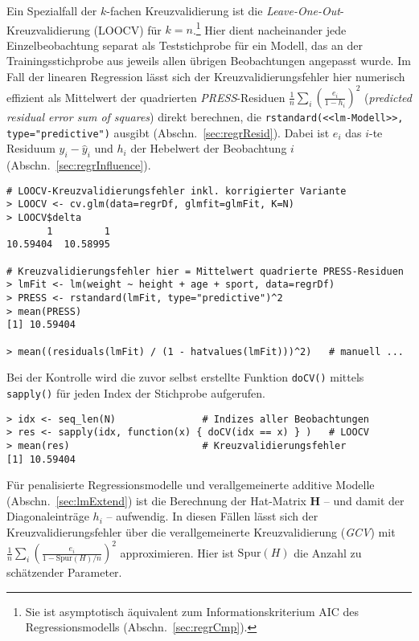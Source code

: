 Ein Spezialfall der $k$-fachen Kreuzvalidierung ist die \emph{Leave-One-Out}-Kreuzvalidierung (LOOCV) für $k = n$.\footnote{Sie ist asymptotisch äquivalent zum Informationskriterium AIC des Regressionsmodells (Abschn.\ \ref{sec:regrCmp}).} Hier dient nacheinander jede Einzelbeobachtung separat als Teststichprobe für ein Modell, das an der Trainingsstichprobe aus jeweils allen übrigen Beobachtungen angepasst wurde. Im Fall der linearen Regression lässt sich der Kreuzvalidierungsfehler hier numerisch effizient als Mittelwert der quadrierten \emph{PRESS}-Residuen $\frac{1}{n} \sum_{i}{\left(\frac{e_{i}}{1 - h_{i}}\right)^{2}}$ (\emph{predicted residual error sum of squares}) direkt berechnen, die \lstinline!rstandard(<<lm-Modell>>, type="predictive")! ausgibt (Abschn.\ \ref{sec:regrResid}). Dabei ist $e_{i}$ das $i$-te Residuum $y_{i} - \hat{y}_{i}$ und $h_{i}$ der Hebelwert der Beobachtung $i$ (Abschn.\ \ref{sec:regrInfluence}).
\begin{lstlisting}
# LOOCV-Kreuzvalidierungsfehler inkl. korrigierter Variante
> LOOCV <- cv.glm(data=regrDf, glmfit=glmFit, K=N)
> LOOCV$delta
       1         1
10.59404  10.58995

# Kreuzvalidierungsfehler hier = Mittelwert quadrierte PRESS-Residuen
> lmFit <- lm(weight ~ height + age + sport, data=regrDf)
> PRESS <- rstandard(lmFit, type="predictive")^2
> mean(PRESS)
[1] 10.59404

> mean((residuals(lmFit) / (1 - hatvalues(lmFit)))^2)   # manuell ...
\end{lstlisting}

Bei der Kontrolle wird die zuvor selbst erstellte Funktion \lstinline!doCV()! mittels \lstinline!sapply()! für jeden Index der Stichprobe aufgerufen.
\begin{lstlisting}
> idx <- seq_len(N)               # Indizes aller Beobachtungen
> res <- sapply(idx, function(x) { doCV(idx == x) } )   # LOOCV
> mean(res)                       # Kreuzvalidierungsfehler
[1] 10.59404
\end{lstlisting}

Für penalisierte Regressionsmodelle und verallgemeinerte additive Modelle (Abschn.\ \ref{sec:lmExtend}) ist die Berechnung der Hat-Matrix $\bm{H}$ -- und damit der Diagonaleinträge $h_{i}$ -- aufwendig. In diesen Fällen lässt sich der Kreuzvalidierungsfehler über die verallgemeinerte Kreuzvalidierung (\emph{GCV}) mit $\frac{1}{n} \sum_{i}{\left(\frac{e_{i}}{1 - \text{Spur}(H)/n}\right)^{2}}$ approximieren. Hier ist $\text{Spur}(H)$ die Anzahl zu schätzender Parameter.

